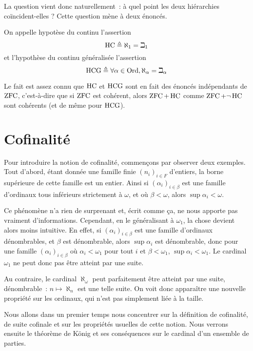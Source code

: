 La question vient donc naturellement~: à quel point les deux hiérarchies
coïncident-elles ? Cette question mène à deux énoncés.

\begin{definition}
  On appelle hypotèse du continu l'assertion
  \[\operatorname{HC} \triangleq \aleph_1 = \beth_1\]
  et l'hypothèse du continu généralisée l'assertion
  \[\operatorname{HCG} \triangleq \forall \alpha \in \operatorname{Ord}, \aleph_\alpha = \beth_\alpha\]
\end{definition}

Le fait est assez connu que $\operatorname{HC}$ et $\operatorname{HCG}$ sont en fait des énoncés
indépendants de $\operatorname{ZFC}$, c'est-à-dire que si $\operatorname{ZFC}$ est cohérent, alors
$\operatorname{ZFC} + \operatorname{HC}$ comme $\operatorname{ZFC} + \lnot\operatorname{HC}$ sont cohérents (et de même pour $\operatorname{HCG}$).

\section{Cofinalité}\label{sct.cof}

Pour introduire la notion de cofinalité, commençons par observer deux exemples.
Tout d'abord, étant donnée une famille finie $(n_i)_{i\in F}$ d'entiers, la borne
supérieure de cette famille est un entier. Ainsi si $(\alpha_i)_{i\in \beta}$ est
une famille d'ordinaux tous inférieurs strictement à $\omega$, et où
$\beta < \omega$, alors $\sup \alpha_i < \omega$.

Ce phénomène n'a rien de surprenant et, écrit comme ça, ne nous apporte pas
vraiment d'informations. Cependant, en le généralisant à $\omega_1$, la chose
devient alors moins intuitive. En effet, si $(\alpha_i)_{i\in \beta}$ est une
famille d'ordinaux dénombrables, et $\beta$ est dénombrable, alors
$\sup \alpha_i$ est dénombrable, donc pour une famille
$(\alpha_i)_{i\in \beta}$ où $\alpha_i < \omega_1$ pour tout $i$ et
$\beta < \omega_1$, $\sup \alpha_i < \omega_1$. Le cardinal $\omega_1$ ne peut
donc pas être atteint par une suite.

Au contraire, le cardinal $\aleph_\omega$ peut parfaitement être atteint par
une suite, dénombrable~: $n \mapsto \aleph_n$ est une telle suite. On voit donc
apparaître une nouvelle propriété sur les ordinaux, qui n'est pas simplement
liée à la taille.

Nous allons dans un premier temps nous concentrer sur la définition de
cofinalité, de suite cofinale et sur les propriétés usuelles de cette notion.
Nous verrons ensuite le théorème de König et ses conséquences sur le cardinal
d'un ensemble de parties.

